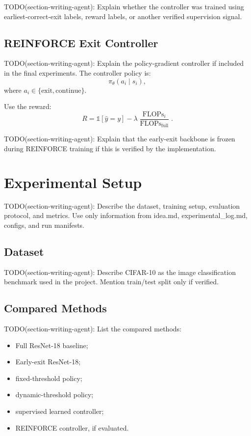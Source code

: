 \documentclass[10pt,twocolumn]{article}
\newcommand{\dataset}{CIFAR-10}
\newcommand{\backbone}{ResNet-18}
\begin{document}
TODO(section-writing-agent): Explain whether the controller was trained using earliest-correct-exit labels, reward labels, or another verified supervision signal.

\subsection{REINFORCE Exit Controller}

TODO(section-writing-agent): Explain the policy-gradient controller if included in the final experiments. The controller policy is:
\begin{equation}
    \pi_\theta(a_i \mid s_i),
\end{equation}
where $a_i \in \{\text{exit}, \text{continue}\}$.

Use the reward:
\begin{equation}
    R =
    \mathbb{1}[\hat{y}=y]
    -
    \lambda
    \frac{\operatorname{FLOPs}_i}
    {\operatorname{FLOPs}_{\text{full}}}.
\end{equation}

TODO(section-writing-agent): Explain that the early-exit backbone is frozen during REINFORCE training if this is verified by the implementation.

\section{Experimental Setup}

TODO(section-writing-agent): Describe the dataset, training setup, evaluation protocol, and metrics. Use only information from idea.md, experimental_log.md, configs, and run manifests.

\subsection{Dataset}

TODO(section-writing-agent): Describe \dataset{} as the image classification benchmark used in the project. Mention train/test split only if verified.

\subsection{Compared Methods}

TODO(section-writing-agent): List the compared methods:
\begin{itemize}
    \item Full \backbone{} baseline;
    \item Early-exit \backbone{};
    \item fixed-threshold policy;
    \item dynamic-threshold policy;
    \item supervised learned controller;
    \item REINFORCE controller, if evaluated.
\end{itemize}
\end{document}
